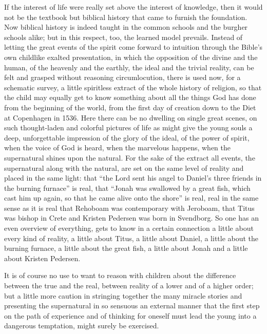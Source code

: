 \documentclass[12pt,a4paper,openany]{book}
\newcommand{\opage}[1]{\marginnote{\footnotesize\textit{[#1]}}}
\begin{document}
\setcounter{footnote}{0}%
\opage{320}If the interest of life were really set above the interest of knowledge,
then it would not be the textbook but biblical history
that came to furnish the foundation. Now biblical history is
indeed taught in the common schools and the burgher schools alike;
but in this respect, too, the learned model prevails.
Instead of letting the great events of the spirit
come forward to intuition through the Bible's own childlike
exalted presentation, in which the opposition of the divine
and the human, of the heavenly and the
earthly, the ideal and the trivial reality, can
be felt and grasped without reasoning circumlocution, there is used
now, for a schematic survey, a little spiritless extract of
the whole history of religion, so that the child may equally get
to know something about all the things God has done from the beginning of the
world, from the first day of creation down to the Diet
at Copenhagen in 1536. Here there can be no dwelling on
single great scenes, on such thought-laden and colorful
pictures of life as might give the young souls a deep, unforgettable
impression of the glory of the ideal, of the power
of spirit, when the voice of God is heard, when the marvelous
happens, when the supernatural shines upon the natural.
For the sake of the extract all events, the supernatural
along with the natural, are set on the same level of reality
and placed in the same light: that ``the Lord sent his
angel to Daniel's three friends in the burning furnace'' is
real, that ``Jonah was swallowed by a great fish, which
cast him up again, so that he came alive onto the
shore'' is real, real in the same sense
as it is real that Rehoboam was contemporary with
Jeroboam, that Titus was bishop in Crete and Kristen
Pedersen was born in Svendborg. So one has an even
\setcounter{footnote}{0}%
\opage{321}overview of everything, gets to know in a certain connection a little about
every kind of reality, a little about Titus, a little
about Daniel, a little about the burning furnace, a little about the
great fish, a little about Jonah and a little about Kristen Pedersen.

It is of course no use to want to reason with
children about the difference between the true and the real,
between reality of a lower and of a higher order;
but a little more caution in stringing together the many
miracle stories and presenting the supernatural
in so sensuous an external manner that the first
step on the path of experience and of thinking for oneself must
lead the young into a dangerous temptation, might surely
be exercised.
\end{document}
